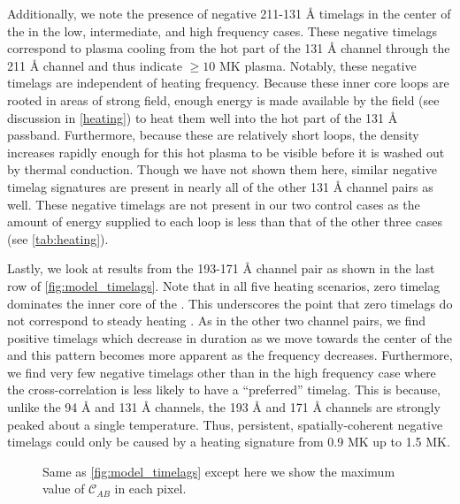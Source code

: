 Additionally, we note the presence of negative 211-131 \AA{} timelags in the center of the \AR{} in the low, intermediate, and high frequency cases. These negative timelags correspond to plasma cooling from the hot part of the 131 \AA{} channel through the 211 \AA{} channel and thus indicate  $\ge10$ MK plasma. Notably, these negative timelags are independent of heating frequency. Because these inner core loops are rooted in areas of strong field, enough energy is made available by the field (see discussion in \autoref{heating}) to heat  them well into the hot part of the 131 \AA{} passband. Furthermore, because these are relatively short loops, the density increases rapidly enough for this hot plasma to be visible before it is washed out by thermal conduction. Though we have not shown them here, similar negative timelag signatures are present in nearly all of the other 131 \AA{} channel pairs as well. These negative timelags are not present in our two control cases as the amount of energy supplied to each loop is less than that of the other three cases (see \autoref{tab:heating}).

Lastly, we look at results from the 193-171 \AA{} channel pair as shown in the last row of \autoref{fig:model_timelags}. Note that in all five heating scenarios, zero timelag dominates the inner core of the \AR{}. This underscores the point that zero timelags do not correspond to steady heating \citep[see][]{viall_transition_2015,viall_signatures_2016}. As in the other two channel pairs, we find positive timelags which decrease in duration as we move towards the center of the \AR{} and this pattern becomes more apparent as the frequency decreases. Furthermore, we find very few negative timelags other than in the high frequency case where the cross-correlation is less likely to have a ``preferred'' timelag. This is because, unlike the 94 \AA{} and 131 \AA{} channels, the 193 \AA{} and 171 \AA{} channels are strongly peaked about a single temperature. Thus, persistent, spatially-coherent negative timelags could only be caused by a heating signature from 0.9 MK up to 1.5 MK. 

\begin{figure*}
    \caption{Same as \autoref{fig:model_timelags} except here we show the maximum value of $\mathcal{C}_{AB}$ in each pixel.}
    \label{fig:model_correlations}
\end{figure*}

